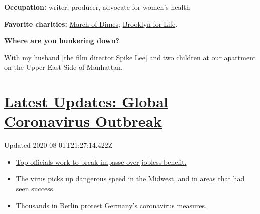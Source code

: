 \textbf{Occupation:} writer, producer, advocate for women's health

\textbf{Favorite charities:}
\href{https://www.marchofdimes.org/giving/support-general.aspx?\&utm_source=google\&utm_medium=cpc\&utm_campaign=alwayson\&utm_content=nonbrand\&utm_term=march\%20of\%20dimes\%20website\&DonationTrackingParam1=alwayson_google\&gclid=EAIaIQobChMI7oXbnKXF6QIVA4vICh1rKA6bEAAYASAAEgJDSPD_BwE\&gclsrc=aw.ds}{March
of Dimes}; \href{https://www.brooklynforlife.org}{Brooklyn for Life}.

\textbf{Where are you hunkering down?}

With my husband {[}the film director Spike Lee{]} and two children at
our apartment on the Upper East Side of Manhattan.

\hypertarget{latest-updates-global-coronavirus-outbreak}{%
\section{\texorpdfstring{\href{https://www.nytimes3xbfgragh.onion/2020/08/01/world/coronavirus-covid-19.html?action=click\&pgtype=Article\&state=default\&region=MAIN_CONTENT_1\&context=storylines_live_updates}{Latest
Updates: Global Coronavirus
Outbreak}}{Latest Updates: Global Coronavirus Outbreak}}\label{latest-updates-global-coronavirus-outbreak}}

Updated 2020-08-01T21:27:14.422Z

\begin{itemize}
\tightlist
\item
  \href{https://www.nytimes3xbfgragh.onion/2020/08/01/world/coronavirus-covid-19.html?action=click\&pgtype=Article\&state=default\&region=MAIN_CONTENT_1\&context=storylines_live_updates\#link-3ac56579}{Top
  officials work to break impasse over jobless benefit.}
\item
  \href{https://www.nytimes3xbfgragh.onion/2020/08/01/world/coronavirus-covid-19.html?action=click\&pgtype=Article\&state=default\&region=MAIN_CONTENT_1\&context=storylines_live_updates\#link-8796723}{The
  virus picks up dangerous speed in the Midwest, and in areas that had
  seen success.}
\item
  \href{https://www.nytimes3xbfgragh.onion/2020/08/01/world/coronavirus-covid-19.html?action=click\&pgtype=Article\&state=default\&region=MAIN_CONTENT_1\&context=storylines_live_updates\#link-25930521}{Thousands
  in Berlin protest Germany's coronavirus measures.}
\end{itemize}

